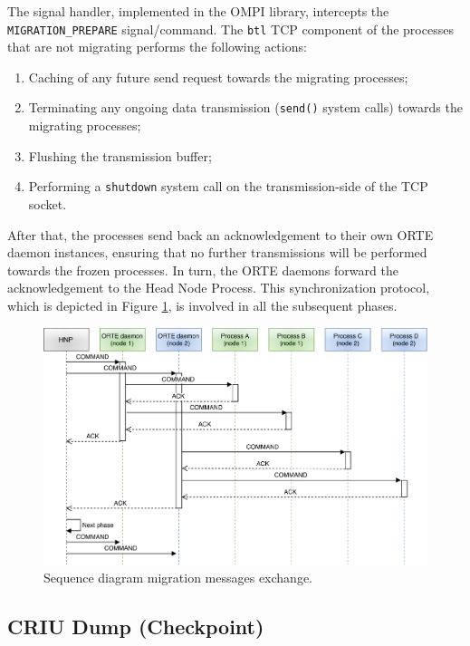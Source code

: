 The signal handler, implemented in the OMPI library, intercepts the\\\texttt
{MIGRATION\_PREPARE} signal/command. The \texttt{btl} TCP component of the
processes that are not migrating performs the
following actions: 
\begin{enumerate}
\item Caching of any future send request towards the
      migrating processes;
\item Terminating any ongoing data transmission (\texttt{send()} system calls)
      towards the migrating processes;
\item Flushing the transmission buffer;
\item Performing a \texttt{shutdown}
      system call on the transmission-side of the TCP socket.
\end{enumerate}

After that, the processes send back an acknowledgement to their own ORTE daemon
instances, ensuring that no further transmissions will be performed towards the
frozen processes. In turn, the ORTE daemons forward the acknowledgement to the
Head Node Process. This synchronization protocol, which is depicted in Figure
\ref{fig:cap4-cmdsequence}, is involved in all the subsequent phases.

\begin{figure}[t]
		\centerline 
{\includegraphics[scale=0.5]{img/cap4-cmdsequence.eps}}
		\caption[Migration messages exchange]{Sequence diagram migration messages exchange.}
		\label{fig:cap4-cmdsequence}
\end{figure}

\subsection{CRIU Dump (Checkpoint)}

